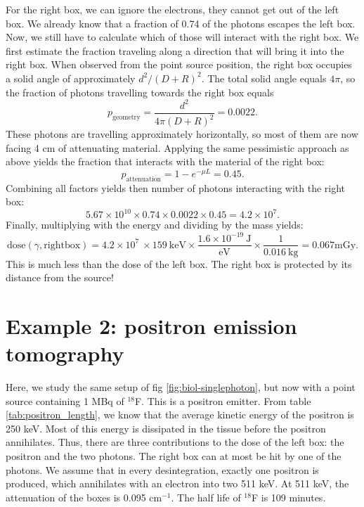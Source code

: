 \documentclass[11pt,oneside]{book}
\begin{document}
For the right box, we can ignore the electrons, they cannot get out of the
left box.  We already know that a fraction of 0.74 of the photons escapes the
left box. Now, we still have to calculate which of those will interact with
the right box. We first estimate the fraction traveling along a direction that
will bring it into the right box.  When observed from the point source
position, the right box occupies a solid angle of approximately $d^2 / (D +
R)^2$. The total solid angle equals $4 \pi$, so the fraction of photons
travelling towards the right box equals
\begin{equation}
  p_{\mbox{geometry}} = \frac{d^2}{4 \pi (D + R)^2} = 0.0022.
\end{equation}
These photons are travelling approximately horizontally, so most of them are
now facing 4 cm of attenuating material. Applying the same pessimistic
approach as above yields the fraction that interacts with the material of the
right box:
\begin{equation}
  p_{\mbox{attenuation}} = 1 - e^{- \mu L} = 0.45.
\end{equation}
Combining all factors yields then number of photons interacting with the right box:
\begin{equation}
  5.67 \times 10^{10} \times 0.74 \times 0.0022 \times 0.45 = 4.2 \times 10^7.
\end{equation}
Finally, multiplying with the energy and dividing by the mass yields:
\begin{equation}
  \mbox{dose}(\gamma, \mbox{rightbox}) = 4.2 \times 10^7\ \times 159\ \mbox{keV}
  \times \frac{1.6 \times 10^{-19} \ \mbox{J}}{\mbox{eV}}
   \times \frac{1}{ 0.016 \ \mbox{kg}}
   = 0.067 \mbox{mGy}.
\end{equation}
This is much less than the dose of the left box. The right box is protected by its
distance from the source!


\section{Example 2: positron emission tomography}
Here, we study the same setup of fig \ref{fig:biol-singlephoton}, but
now with a point source containing 1 MBq of $^{18}$F. This is a
positron emitter. From table \ref{tab:positron_length}, we know that
the average kinetic energy of the positron is 250 keV. Most of this
energy is dissipated in the tissue before the positron
annihilates. Thus, there are three contributions to the dose of the
left box: the positron and the two photons. The right box can at most
be hit by one of the photons.
%
We assume that in every desintegration, exactly one positron is
produced, which annihilates with an electron into two 511 keV.  At 511
keV, the attenuation of the boxes is 0.095 cm$^{-1}$. The half life of
$^{18}$F is 109 minutes.
\end{document}
